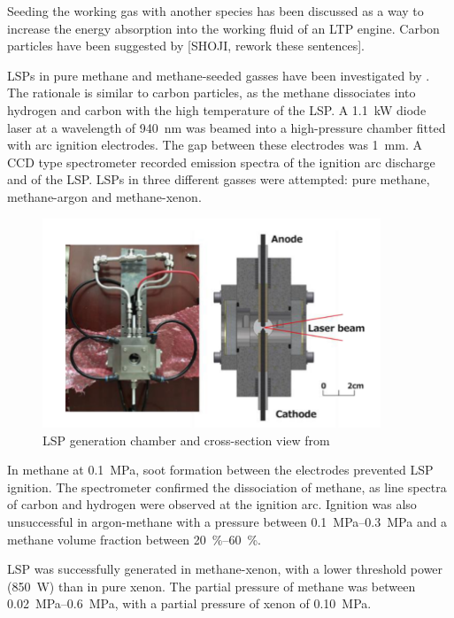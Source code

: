         Seeding the working gas with another species has been discussed as a way to increase the energy absorption into the working fluid of an LTP engine. Carbon particles have been suggested by [SHOJI, rework these sentences].

        LSPs in pure methane and methane-seeded gasses have been investigated by \textcite{kameiMethaneMethaneXenon2020}. The rationale is similar to carbon particles, as the methane dissociates into hydrogen and carbon with the high temperature of the LSP. A \qty{1.1}{kW} diode laser at a wavelength of \qty{940}{nm} was beamed into a high-pressure chamber fitted with arc ignition electrodes. The gap between these electrodes was \qty{1}{mm}. A CCD type spectrometer recorded emission spectra of the ignition arc discharge and of the LSP. LSPs in three different gasses were attempted: pure methane, methane-argon and methane-xenon.
        \begin{figure}[!ht]
            \centering
            \includegraphics[width=0.9\textwidth]{assets/2 background/Kamei apparatus.png}
            \caption{LSP generation chamber and cross-section view from \textcite{kameiMethaneMethaneXenon2020}}
            \label{fig:Kamei}
        \end{figure}
        In methane at \qty{0.1}{MPa}, soot formation between the electrodes prevented LSP ignition. The spectrometer confirmed the dissociation of methane, as line spectra of carbon and hydrogen were observed at the ignition arc. Ignition was also unsuccessful in argon-methane with a pressure between \qtyrange{0.1}{0.3}{MPa} and a methane volume fraction between \qtyrange{20}{60}{\%}.
        
        LSP was successfully generated in methane-xenon, with a lower threshold power (\qty{850}{W}) than in pure xenon. The partial pressure of methane was between \qtyrange{0.02}{0.6}{MPa}, with a partial pressure of xenon of \qty{0.10}{MPa}.

